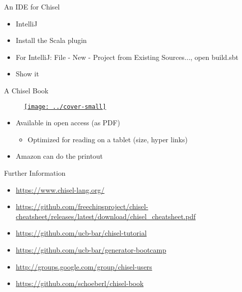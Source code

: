 \begin{frame}[fragile]{An IDE for Chisel}
\begin{itemize}
\item IntelliJ
\item Install the Scala plugin
\item For IntelliJ: File - New - Project from Existing Sources..., open build.sbt
\item Show it %
\end{itemize}
\end{frame}


\begin{frame}[fragile]{A Chisel Book}
\begin{figure}
    \centering
    \href{https://github.com/schoeberl/chisel-book}{\texttt{[image: ../cover-small]}}
\end{figure}

\begin{itemize}
\item Available in open access (as PDF)
\begin{itemize}
\item Optimized for reading on a tablet (size, hyper links)
\end{itemize}
\item Amazon can do the printout
\end{itemize}
\end{frame}

\begin{frame}[fragile]{Further Information}
\begin{itemize}
\item \url{https://www.chisel-lang.org/}
\item \url{https://github.com/freechipsproject/chisel-cheatsheet/releases/latest/download/chisel_cheatsheet.pdf}
\item \url{https://github.com/ucb-bar/chisel-tutorial}
\item \url{https://github.com/ucb-bar/generator-bootcamp}
\item \url{http://groups.google.com/group/chisel-users}
\item \url{https://github.com/schoeberl/chisel-book}
\end{itemize}
\end{frame}


